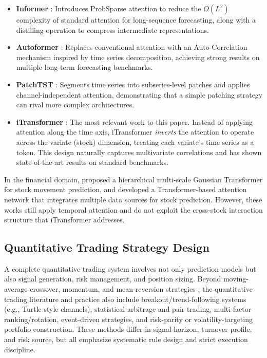 \documentclass[12pt, a4paper]{article}
\begin{document}
\begin{itemize}[leftmargin=2em]
    \item \textbf{Informer} \citep{zhou2021informer}: Introduces ProbSparse attention to reduce the $O(L^2)$ complexity of standard attention for long-sequence forecasting, along with a distilling operation to compress intermediate representations.

    \item \textbf{Autoformer} \citep{wu2021autoformer}: Replaces conventional attention with an Auto-Correlation mechanism inspired by time series decomposition, achieving strong results on multiple long-term forecasting benchmarks.

    \item \textbf{PatchTST} \citep{nie2023patchtst}: Segments time series into subseries-level patches and applies channel-independent attention, demonstrating that a simple patching strategy can rival more complex architectures.

    \item \textbf{iTransformer} \citep{liu2024itransformer}: The most relevant work to this paper. Instead of applying attention along the time axis, iTransformer \emph{inverts} the attention to operate across the variate (stock) dimension, treating each variate's time series as a token. This design naturally captures multivariate correlations and has shown state-of-the-art results on standard benchmarks.
\end{itemize}

In the financial domain, \citet{ding2020hierarchical} proposed a hierarchical multi-scale Gaussian Transformer for stock movement prediction, and \citet{zhang2020transformer_stock} developed a Transformer-based attention network that integrates multiple data sources for stock prediction. However, these works still apply temporal attention and do not exploit the cross-stock interaction structure that iTransformer addresses.

\subsection{Quantitative Trading Strategy Design}

A complete quantitative trading system involves not only prediction models but also signal generation, risk management, and position sizing. Beyond moving-average crossover, momentum, and mean-reversion strategies \citep{murphy1999technical}, the quantitative trading literature and practice also include breakout/trend-following systems (e.g., Turtle-style channels), statistical arbitrage and pair trading, multi-factor ranking/rotation, event-driven strategies, and risk-parity or volatility-targeting portfolio construction. These methods differ in signal horizon, turnover profile, and risk source, but all emphasize systematic rule design and strict execution discipline.
\end{document}

